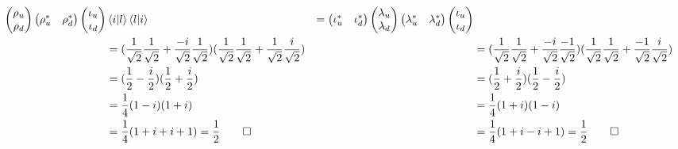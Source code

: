 \documentclass[solutions.tex]{subfiles}
\begin{document}
\begin{align*}
\begin{pmatrix}
	\rho_u \\
	\rho_d \\
\end{pmatrix}
\begin{pmatrix}
	\rho_u^* & \rho_d^* \\
\end{pmatrix}
\begin{pmatrix}
	\iota_u \\
	\iota_d \\
\end{pmatrix} &
\left\langle i \middle| l \right\rangle\left\langle l \middle| i \right\rangle &=
\begin{pmatrix}
	\iota_u^* & \iota_d^* \\
\end{pmatrix}
\begin{pmatrix}
	\lambda_u \\
	\lambda_d \\
\end{pmatrix}
\begin{pmatrix}
	\lambda_u^* & \lambda_d^* \\
\end{pmatrix}
\begin{pmatrix}
	\iota_u \\
	\iota_d \\
\end{pmatrix} \\
~ &= (\frac1{\sqrt2}\frac1{\sqrt2}+\frac{-i}{\sqrt2}\frac{1}{\sqrt2})
(\frac1{\sqrt2}\frac1{\sqrt2}+\frac{1}{\sqrt2}\frac{i}{\sqrt2})
& ~ &= (\frac1{\sqrt2}\frac1{\sqrt2}+\frac{-i}{\sqrt2}\frac{-1}{\sqrt2})
(\frac1{\sqrt2}\frac1{\sqrt2}+\frac{-1}{\sqrt2}\frac{i}{\sqrt2}) \\
~ &= (\frac1{2}-\frac{i}{2})(\frac1{2}+\frac{i}{2})
& ~ &= (\frac1{2}+\frac{i}{2})(\frac1{2}-\frac{i}{2}) \\
~ &= \frac1{4}(1-i)(1+i)
& ~ &= \frac1{4}(1+i)(1-i) \\
~ &= \frac1{4}(1+i+i+1) = \frac1{2}\qed
& ~ &= \frac1{4}(1+i-i+1) = \frac1{2}\qed \\
\end{align*}
\end{document}

